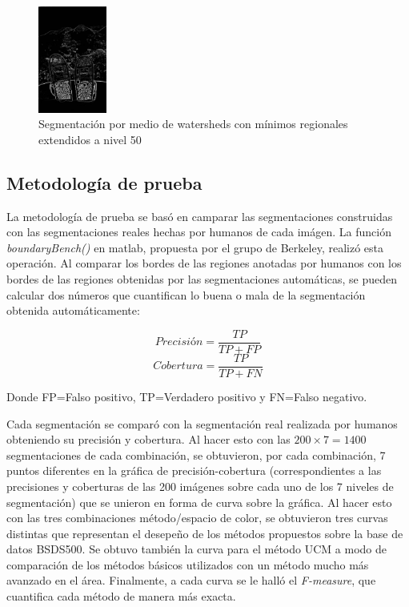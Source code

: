 \documentclass[10pt,twocolumn,letterpaper]{article}
\begin{document}
\begin{figure}[h]
    \centering
    \includegraphics[width=0.2\textwidth]{Watersheds.jpg}
    \caption{Segmentación por medio de watersheds con mínimos regionales extendidos a nivel 50}
    \label{fig:watersheds}
\end{figure}

\subsection{Metodología de prueba}
La metodología de prueba se basó en camparar las segmentaciones construidas con las segmentaciones reales hechas por humanos de cada imágen. La función \textit{boundaryBench()} en matlab, propuesta por el grupo de Berkeley, realizó esta operación. Al comparar los bordes de las regiones anotadas por humanos con los bordes de las regiones obtenidas por las segmentaciones automáticas, se pueden calcular dos números que cuantifican lo buena o mala de la segmentación obtenida automáticamente:

\begin{equation} 
 Precisión=\frac{TP}{TP+FP}
\end{equation}
\begin{equation} 
 Cobertura=\frac{TP}{TP+FN}
\end{equation}

Donde FP=Falso positivo, TP=Verdadero positivo y FN=Falso negativo.

Cada segmentación se comparó con la segmentación real realizada por humanos obteniendo su precisión y cobertura. Al hacer esto con las \(200 \times 7 = 1400\) segmentaciones de cada combinación, se obtuvieron, por cada combinación, 7 puntos diferentes en la gráfica de precisión-cobertura (correspondientes a las precisiones y coberturas de las 200 imágenes sobre cada uno de los 7 niveles de segmentación) que se unieron en forma de curva sobre la gráfica. Al hacer esto con las tres combinaciones método/espacio de color, se obtuvieron tres curvas distintas que representan el desepeño de los métodos propuestos sobre la base de datos BSDS500. Se obtuvo también la curva para el método UCM a modo de comparación de los métodos básicos utilizados con un método mucho más avanzado en el área. Finalmente, a cada curva se le halló el \textit{F-measure}, que cuantifica cada método de manera más exacta.
\end{document}

